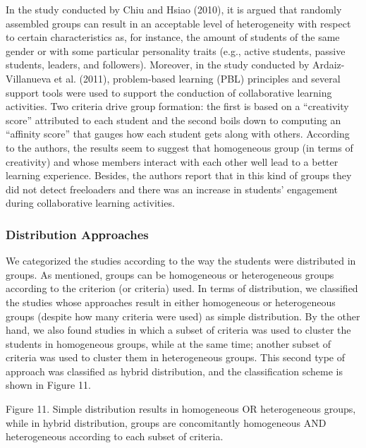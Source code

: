 In the study conducted by Chiu and Hsiao (2010), it is argued that randomly assembled groups can result in an acceptable level of heterogeneity with respect to certain characteristics as, for instance, the amount of students of the same gender or with some particular personality traits (e.g., active students, passive students, leaders, and followers). Moreover, in the study conducted by Ardaiz-Villanueva et al. (2011), problem-based learning (PBL) principles and several support tools were used to support the conduction of collaborative learning activities. Two criteria drive group formation: the first is based on a “creativity score” attributed to each student and the second boils down to computing an “affinity score” that gauges how each student gets along with others. According to the authors, the results seem to suggest that homogeneous group (in terms of creativity) and whose members interact with each other well lead to a better learning experience. Besides, the authors report that in this kind of groups they did not detect freeloaders and there was an increase in students’ engagement during collaborative learning activities.

\subsubsection{Distribution Approaches}

We categorized the studies according to the way the students were distributed in groups. As mentioned, groups can be homogeneous or heterogeneous groups according to the criterion (or criteria) used. In terms of distribution, we classified the studies whose approaches result in either homogeneous or heterogeneous groups (despite how many criteria were used) as simple distribution. By the other hand, we also found studies in which a subset of criteria was used to cluster the students in homogeneous groups, while at the same time; another subset of criteria was used to cluster them in heterogeneous groups. This second type of approach was classified as hybrid distribution, and the classification scheme is shown in Figure 11.

Figure 11. Simple distribution results in homogeneous OR heterogeneous groups, while in hybrid distribution, groups are concomitantly homogeneous AND heterogeneous according to each subset of criteria.

